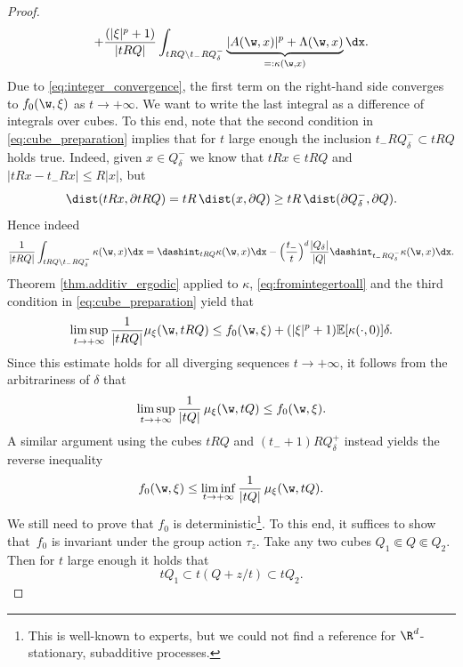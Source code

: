 \begin{proof}
\begin{multline}
+\frac{(|\xi|^p+1)}{|tRQ|}\int_{tRQ\setminus t_-RQ_{\delta}^-}\underbrace{|A(\w,x)|^p+\Lambda(\w,x)}_{=:\kappa(\w,x)}\dx.
\end{multline}
Due to \eqref{eq:integer_convergence}, the first term on the right-hand side converges to $f_0(\w,\xi)$ as $t\to +\infty$. We want to write the last integral as a difference of integrals over cubes. To this end, note that the second condition in \eqref{eq:cube_preparation} implies that for $t$ large enough the inclusion $t_-RQ_{\delta}^-\subset tRQ$ holds true. Indeed, given $x\in Q_{\delta}^-$ we know that $tRx\in tRQ$ and $|tRx-t_-Rx|\leq R|x|$, but
\begin{equation*}
\dist(tRx,\partial tRQ)=tR\,\dist(x,\partial Q)\geq tR\,\dist(\partial Q_{\delta}^-,\partial Q).
\end{equation*}
Hence indeed
\begin{equation*}
\frac{1}{|tRQ|}\int_{tRQ\setminus t_-RQ_{\delta}^-}\kappa(\w,x)\dx=\dashint_{tRQ}\kappa(\w,x)\dx- \Bigl(\frac{t_-}{t}\Bigr)^d\frac{|Q_{\delta}|}{|Q|}\dashint_{t_-RQ_{\delta}^-}\kappa(\w,x)\dx.
\end{equation*}
Theorem \ref{thm.additiv_ergodic} applied to $\kappa$, \eqref{eq:fromintegertoall} and the third condition in \eqref{eq:cube_preparation} yield that
\begin{equation*}
\limsup_{t\to +\infty}\frac{1}{|tRQ|}\mu_{\xi}(\w,tRQ)\leq f_{0}(\w,\xi)+(|\xi|^p+1)\mathbb{E}[\kappa(\cdot,0)]\delta .
\end{equation*}
Since this estimate holds for all diverging sequences $t\to +\infty$, it follows from the arbitrariness of $\delta$ that
\begin{equation*}
\limsup_{t\to +\infty}\frac{1}{|tQ|}\,\mu_{\xi}(\w,tQ)\leq f_{0}(\w,\xi).
\end{equation*}
A similar argument using the cubes $tRQ$ and $(t_-+1)RQ_{\delta}^+$ instead yields the reverse inequality
\begin{equation*}
f_{0}(\w,\xi)\leq\liminf_{t\to +\infty}\frac{1}{|tQ|}\,\mu_{\xi}(\w,tQ).
\end{equation*}
We still need to prove that $f_0$ is deterministic\footnote{This is well-known to experts, but we could not find a reference for $\R^d$- stationary, subadditive processes.}. To this end, it suffices to show that~$f_0$ is invariant under the group action $\tau_z$. Take any two cubes $Q_1\Subset Q\Subset Q_2$. Then for $t$ large enough it holds that
\begin{equation*}
tQ_1\subset t(Q+z/t)\subset tQ_2.
\end{equation*}

\end{proof}
